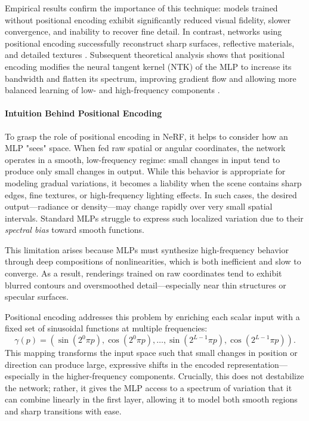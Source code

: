 Empirical results confirm the importance of this technique: models trained without positional encoding exhibit significantly reduced visual fidelity, slower convergence, and inability to recover fine detail. In contrast, networks using positional encoding successfully reconstruct sharp surfaces, reflective materials, and detailed textures \cite{mildenhall2020_nerf}. Subsequent theoretical analysis shows that positional encoding modifies the neural tangent kernel (NTK) of the MLP to increase its bandwidth and flatten its spectrum, improving gradient flow and allowing more balanced learning of low- and high-frequency components \cite{tancik2020_fourierfeatures}.

\paragraph{Intuition Behind Positional Encoding}

To grasp the role of positional encoding in NeRF, it helps to consider how an MLP "sees" space. When fed raw spatial or angular coordinates, the network operates in a smooth, low-frequency regime: small changes in input tend to produce only small changes in output. While this behavior is appropriate for modeling gradual variations, it becomes a liability when the scene contains sharp edges, fine textures, or high-frequency lighting effects. In such cases, the desired output—radiance or density—may change rapidly over very small spatial intervals. Standard MLPs struggle to express such localized variation due to their \emph{spectral bias} toward smooth functions.

This limitation arises because MLPs must synthesize high-frequency behavior through deep compositions of nonlinearities, which is both inefficient and slow to converge. As a result, renderings trained on raw coordinates tend to exhibit blurred contours and oversmoothed detail—especially near thin structures or specular surfaces.

Positional encoding addresses this problem by enriching each scalar input with a fixed set of sinusoidal functions at multiple frequencies:
\[
\gamma(p) = \left( \sin(2^0 \pi p), \cos(2^0 \pi p), \ldots, \sin(2^{L-1} \pi p), \cos(2^{L-1} \pi p) \right).
\]
This mapping transforms the input space such that small changes in position or direction can produce large, expressive shifts in the encoded representation—especially in the higher-frequency components. Crucially, this does not destabilize the network; rather, it gives the MLP access to a spectrum of variation that it can combine linearly in the first layer, allowing it to model both smooth regions and sharp transitions with ease.

